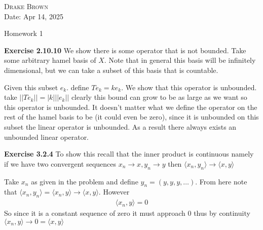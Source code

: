 \documentclass[12pt]{article}
\newenvironment{exercise}[1]{\vspace{.1in}\noindent\textbf{Exercise #1 \hspace{.05em}}}{}
\theoremstyle{definition}
\theoremstyle{remark}
\begin{document}
\begin{flushright}
	\textsc{Drake Brown}  \\
	Date: Apr 14, 2025
\end{flushright}
\begin{center}
	Homework 1
\end{center}

\begin{exercise}{2.10.10}
	We show there is some operator that is not bounded. Take some arbitrary hamel basis of $X$. Note that in general this basis will be infinitely dimensional, but we can take a subset of this basis that is countable.

	Given this subset $e_k$. define $Te_k=ke_k$. We show that this operator is unbounded. take $||Te_k||=|k|||e_k||$ clearly this bound can grow to be as large as we want so this operator is unbounded. It doesn't matter what we define the operator on the rest of the hamel basis to be (it could even be zero), since it is unbounded on this subset the linear operator is unbounded. As a result there always exists an unbounded linear operator.
\end{exercise}

\begin{exercise}{3.2.4}
	To show this recall that the inner product is continuous namely if we have two convergent sequences $x_n\rightarrow x,y_n\rightarrow y$ then $\langle x_n, y_n\rangle \rightarrow \langle x, y\rangle $

	Take $x_n$ as given in the problem and define $y_n=(y,y,y,\dots)$. From here note that $\langle x_n,y_n\rangle = \langle x_n, y\rangle \rightarrow \langle x, y\rangle $. However
	\begin{align}
		\langle x_n, y\rangle =0
	\end{align}
	So since it is a constant sequence of zero it must approach $0$ thus by continuity $\langle x_n, y\rangle \rightarrow 0=\langle x, y\rangle $
\end{exercise}
\end{document}
